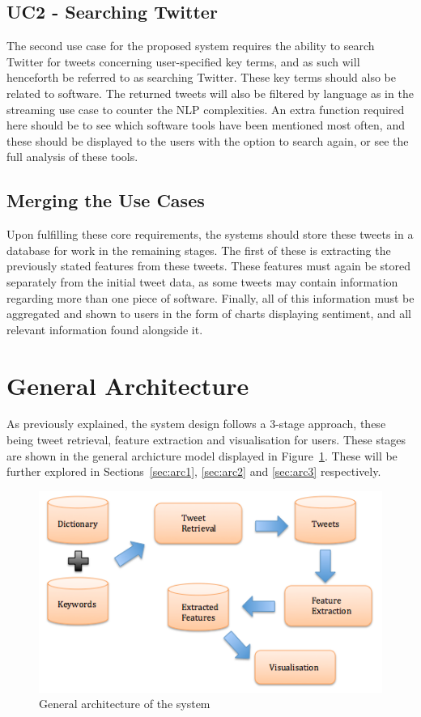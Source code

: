 \subsection[Use Case 2]{UC2 - Searching Twitter}
\label{sec:uc2}
The second use case for the proposed system requires the ability to search Twitter for tweets concerning user-specified key terms, and as such will henceforth be referred to as searching Twitter. These key terms should also be related to software. The returned tweets will also be filtered by language as in the streaming use case to counter the NLP complexities. An extra function required here should be to see which software tools have been mentioned most often, and these should be displayed to the users with the option to search again, or see the full analysis of these tools.


\subsection{Merging the Use Cases}
Upon fulfilling these core requirements, the systems should store these tweets in a database for work in the remaining stages. The first of these is extracting the previously stated features from these tweets. These features must again be stored separately from the initial tweet data, as some tweets may contain information regarding more than one piece of software. Finally, all of this information must be aggregated and shown to users in the form of charts displaying sentiment, and all relevant information found alongside it.


\section{General Architecture}
As previously explained, the system design follows a 3-stage approach, these being tweet retrieval, feature extraction and visualisation for users. These stages are shown in the general archicture model displayed in Figure~\ref{fig:general}. These will be further explored in Sections~\ref{sec:arc1}, \ref{sec:arc2} and \ref{sec:arc3} respectively.

\begin{figure}[h]
\begin{center}
\includegraphics[width=12cm]{design}
\end{center}
\caption{General architecture of the system}
\label{fig:general}
\end{figure}


